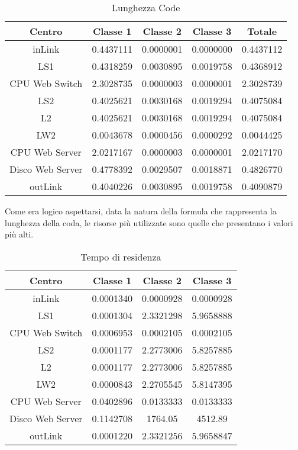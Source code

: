 \begin{table}[htbp]
\begin{center}
\begin{tabular}{|c|c|c|c|c|}
\hline
Centro	&Classe 1	&Classe 2	&Classe 3 &Totale\\
\hline
\hline
inLink & 0.4437111 & 0.0000001 & 0.0000000 & 0.4437112 \\ \hline
LS1 & 0.4318259 & 0.0030895 & 0.0019758 & 0.4368912 \\ \hline
CPU Web Switch & 2.3028735 & 0.0000003 & 0.0000001 & 2.3028739 \\ \hline
LS2 & 0.4025621 & 0.0030168 & 0.0019294 & 0.4075084 \\ \hline
L2 & 0.4025621 & 0.0030168 & 0.0019294 & 0.4075084 \\ \hline
LW2 & 0.0043678 & 0.0000456 & 0.0000292 & 0.0044425 \\ \hline
CPU Web Server & 2.0217167 & 0.0000003 & 0.0000001 & 2.0217170 \\ \hline
Disco Web Server & 0.4778392 & 0.0029507 & 0.0018871 & 0.4826770 \\ \hline
outLink & 0.4040226 & 0.0030895 & 0.0019758 & 0.4090879 \\ \hline
\end{tabular}
\end{center}
\caption{Lunghezza Code}
\label{lunghezzacode}
\end{table}
Come era logico aspettarsi, data la natura della formula che rappresenta la lunghezza della coda, le risorse più utilizzate sono quelle che presentano i valori più alti.
\begin{table}[htbp]
\begin{center}
\begin{tabular}{|c|c|c|c|}
\hline
Centro	&Classe 1	&Classe 2	&Classe 3\\
\hline
\hline
inLink & 0.0001340 & 0.0000928 & 0.0000928 \\ \hline
LS1 & 0.0001304 & 2.3321298 & 5.9658888 \\ \hline
CPU Web Switch & 0.0006953 & 0.0002105 & 0.0002105 \\ \hline
LS2 & 0.0001177 & 2.2773006 & 5.8257885 \\ \hline
L2 & 0.0001177 & 2.2773006 & 5.8257885 \\ \hline
LW2 & 0.0000843 & 2.2705545 & 5.8147395 \\ \hline
CPU Web Server & 0.0402896 & 0.0133333 & 0.0133333 \\ \hline
Disco Web Server & 0.1142708 & 1764.05 & 4512.89 \\ \hline
outLink & 0.0001220 & 2.3321256 & 5.9658847 \\ \hline
\end{tabular}
\end{center}
\caption{Tempo di residenza}
\label{tempodiresidenza}
\end{table}
